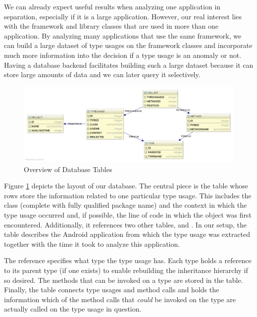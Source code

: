 We can already expect useful results when analyzing one application in separation, especially if it is a large application.
However, our real interest lies with the framework and library classes that are used in more than one application.
By analyzing many applications that use the same framework, we can build a large dataset of type usages on the framework classes and incorporate much more information into the decision if a type usage is an anomaly or not.
Having a database backend facilitates building such a large dataset because it can store large amounts of data and we can later query it selectively.

\begin{figure}[t]
    \centering
    \includegraphics[width=\textwidth]{figures/database_layout-light}
    \caption{Overview of Database Tables}
    \label{fig:db_layout}
\end{figure}

Figure \ref{fig:db_layout} depicts the layout of our database.
The central piece is the  table whose rows store the information related to one particular type usage.
This includes the class (complete with fully qualified package name) and the context in which the type usage occurred and, if possible, the line of code in which the object was first encountered.
Additionally, it references two other tables,  and .
In our setup, the  table describes the Android application from which the type usage was extracted together with the time it took to analyze this application.

The  reference specifies what type the type usage has. Each type holds a reference to its parent type (if one exists) to enable rebuilding the inheritance hierarchy if so desired.
The methods that can be invoked on a type are stored in the  table.
Finally, the  table connects type usages and method calls and holds the information which of the method calls that \emph{could} be invoked on the type are actually called on the type usage in question.


